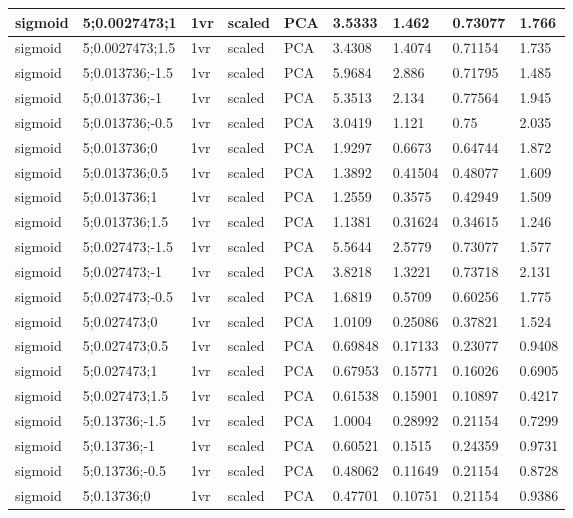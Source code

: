 \begin{longtable}{lllllllll}
sigmoid & 5;0.0027473;1 & 1vr & scaled & PCA & 3.5333 & 1.462 & 0.73077 & 1.766\\ \hline
sigmoid & 5;0.0027473;1.5 & 1vr & scaled & PCA & 3.4308 & 1.4074 & 0.71154 & 1.735\\ \hline
sigmoid & 5;0.013736;-1.5 & 1vr & scaled & PCA & 5.9684 & 2.886 & 0.71795 & 1.485\\ \hline
sigmoid & 5;0.013736;-1 & 1vr & scaled & PCA & 5.3513 & 2.134 & 0.77564 & 1.945\\ \hline
sigmoid & 5;0.013736;-0.5 & 1vr & scaled & PCA & 3.0419 & 1.121 & 0.75 & 2.035\\ \hline
sigmoid & 5;0.013736;0 & 1vr & scaled & PCA & 1.9297 & 0.6673 & 0.64744 & 1.872\\ \hline
sigmoid & 5;0.013736;0.5 & 1vr & scaled & PCA & 1.3892 & 0.41504 & 0.48077 & 1.609\\ \hline
sigmoid & 5;0.013736;1 & 1vr & scaled & PCA & 1.2559 & 0.3575 & 0.42949 & 1.509\\ \hline
sigmoid & 5;0.013736;1.5 & 1vr & scaled & PCA & 1.1381 & 0.31624 & 0.34615 & 1.246\\ \hline
sigmoid & 5;0.027473;-1.5 & 1vr & scaled & PCA & 5.5644 & 2.5779 & 0.73077 & 1.577\\ \hline
sigmoid & 5;0.027473;-1 & 1vr & scaled & PCA & 3.8218 & 1.3221 & 0.73718 & 2.131\\ \hline
sigmoid & 5;0.027473;-0.5 & 1vr & scaled & PCA & 1.6819 & 0.5709 & 0.60256 & 1.775\\ \hline
sigmoid & 5;0.027473;0 & 1vr & scaled & PCA & 1.0109 & 0.25086 & 0.37821 & 1.524\\ \hline
sigmoid & 5;0.027473;0.5 & 1vr & scaled & PCA & 0.69848 & 0.17133 & 0.23077 & 0.9408\\ \hline
sigmoid & 5;0.027473;1 & 1vr & scaled & PCA & 0.67953 & 0.15771 & 0.16026 & 0.6905\\ \hline
sigmoid & 5;0.027473;1.5 & 1vr & scaled & PCA & 0.61538 & 0.15901 & 0.10897 & 0.4217\\ \hline
sigmoid & 5;0.13736;-1.5 & 1vr & scaled & PCA & 1.0004 & 0.28992 & 0.21154 & 0.7299\\ \hline
sigmoid & 5;0.13736;-1 & 1vr & scaled & PCA & 0.60521 & 0.1515 & 0.24359 & 0.9731\\ \hline
sigmoid & 5;0.13736;-0.5 & 1vr & scaled & PCA & 0.48062 & 0.11649 & 0.21154 & 0.8728\\ \hline
sigmoid & 5;0.13736;0 & 1vr & scaled & PCA & 0.47701 & 0.10751 & 0.21154 & 0.9386\\ \hline

\end{longtable}
